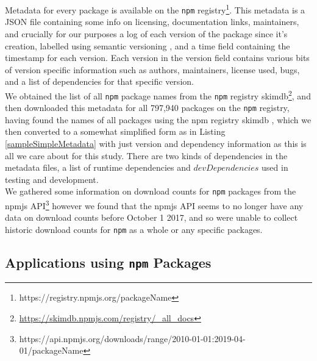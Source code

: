 \documentclass[10pt,conference]{IEEEtran}
\def\code#1{\texttt{#1}}
\begin{document}
  Metadata for every package is available on the \code{npm} registry\footnote{https://registry.npmjs.org/packageName}. 
  This metadata is a JSON file containing some info on licensing, documentation links, maintainers, and crucially for 
  our purposes a log of each version of the package since it's creation, labelled using semantic versioning \cite{preston-werner},
  and a time field containing the timestamp for each version. Each version in the version field contains various bits of 
  version specific information such as authors, maintainers, license used, bugs, and a list of dependencies for that specific
  version.\\

  We obtained the list of all \code{npm} package names from the \code{npm} registry skimdb\footnote{\url{https://skimdb.npmjs.com/registry/_all_docs}}, and then %
  downloaded this metadata for all 797,940 packages on the \code{npm} registry, having found the names of all packages using the npm registry skimdb
  , which we then converted to a somewhat simplified form as in Listing \ref{sampleSimpleMetadata} with just version and dependency information as this is all
  we care about for this study. There are two kinds of dependencies in the metadata files, a list of runtime dependencies and $devDependencies$ used in testing and development.\\

  We gathered some information on download counts for \code{npm} packages from the npmjs API\footnote{https://api.npmjs.org/downloads/range/2010-01-01:2019-04-01/packageName} 
  however we found that the npmjs API seems to no longer have any data on download counts before October 1 2017, and so were unable to collect
  historic download counts for \code{npm} as a whole or any specific packages.\\

  \subsection{Applications using \code{npm} Packages}
\end{document}
